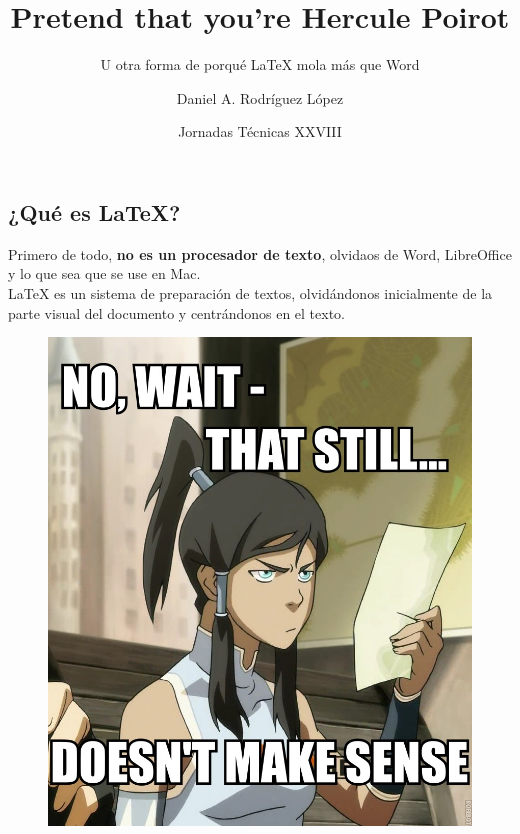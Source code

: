 \documentclass{beamer} %
\title[Pretend that you're Hercule Poirot] %
{Pretend that you're Hercule Poirot}
\subtitle{U otra forma de porqué LaTeX mola más que Word}
\author[Daniel A. Rodríguez López] %
  {Daniel A. Rodríguez López}
\date[XX-04-2016] %
  {Jornadas Técnicas XXVIII}
\begin{document}
  \frame{\titlepage}

  \begin{frame}
    \section{¿Qué es LaTeX?}
    Primero de todo, \textbf{no es un procesador de texto}, olvidaos de Word, LibreOffice y lo que sea que se use en Mac.\\

    LaTeX es un sistema de preparación de textos, olvidándonos inicialmente de la parte visual del documento y centrándonos en el texto.
    \begin{figure}
      \includegraphics[scale=0.1]{images/imagen3}
    \end{figure}
  \end{frame}

\end{document}
